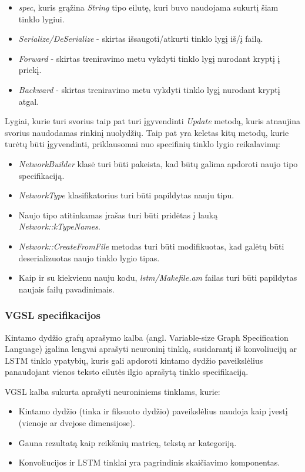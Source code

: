 \documentclass{VUMIFInfBakalaurinis}
\begin{document}
\begin{itemize}[itemsep=0.5pt]
  \item \textit{spec}, kuris grąžina \textit{String} tipo eilutę, kuri buvo naudojama sukurtį šiam tinklo lygiui.
  \item \textit{Serialize/DeSerialize} - skirtas išsaugoti/atkurti tinklo lygį iš/į failą.
  \item \textit{Forward} - skirtas treniravimo metu vykdyti tinklo lygį nurodant kryptį į priekį.
  \item \textit{Backward} - skirtas treniravimo metu vykdyti tinklo lygį nurodant kryptį atgal.
\end{itemize}

Lygiai, kurie turi svorius taip pat turi įgyvendinti \textit{Update} metodą, kuris atnaujina svorius naudodamas rinkinį nuolydžių.
Taip pat yra keletas kitų metodų, kurie turėtų būti įgyvendinti, priklausomai nuo specifinių tinklo lygio reikalavimų:

\begin{itemize}[itemsep=0.5pt]
  \item \textit{NetworkBuilder} klasė turi būti pakeista, kad būtų galima apdoroti naujo tipo specifikaciją.
  \item \textit{NetworkType} klasifikatorius turi būti papildytas nauju tipu.
  \item Naujo tipo atitinkamas įrašas turi būti pridėtas į lauką \textit{Network::kTypeNames}.
  \item \textit{Network::CreateFromFile} metodas turi būti modifikuotas, kad galėtų būti deserializuotas naujo tinklo lygio tipas.
  \item Kaip ir su kiekvienu nauju kodu, \textit{lstm/Makefile.am} failas turi būti papildytas naujais failų pavadinimais. 
\end{itemize}

\subsubsection{VGSL specifikacijos}
Kintamo dydžio grafų aprašymo kalba (angl. Variable-size Graph Specification Language) įgalina lengvai aprašyti neuroninį tinklą, 
susidarantį iš konvoliucijų ar LSTM tinklo ypatybių, kuris gali apdoroti kintamo dydžio paveikslėlius panaudojant vienos teksto eilutės ilgio aprašytą tinklo specifikaciją.

VGSL kalba sukurta aprašyti neuroniniems tinklams, kurie:

\begin{itemize}[itemsep=0.5pt]
  \item Kintamo dydžio (tinka ir fiksuoto dydžio) paveikslėlius naudoja kaip įvestį (vienoje ar dvejose dimensijose).
  \item Gauna rezultatą kaip reikšmių matricą, tekstą ar kategoriją.
  \item Konvoliucijos ir LSTM tinklai yra pagrindinis skaičiavimo komponentas.
\end{itemize}
\end{document}
